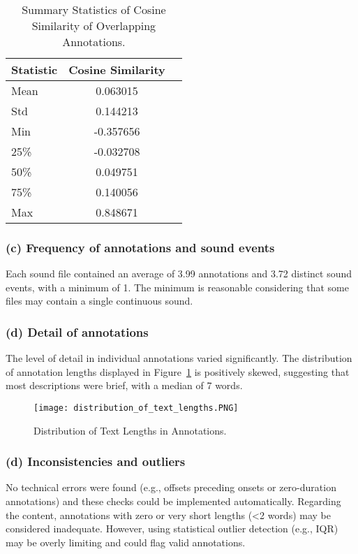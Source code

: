 \documentclass{article}
\begin{document}
\begin{table}[h]
    \caption{Summary Statistics of Cosine Similarity of Overlapping Annotations.}
    \label{tab:cos}
    \centering
    \begin{tabular}{lcl}
        \toprule
        Statistic & Cosine Similarity \\ \midrule
        Mean            & 0.063015 \\
        Std             & 0.144213 \\
        Min             & -0.357656 \\
        25\%            & -0.032708 \\
        50\%            & 0.049751 \\
        75\%            & 0.140056 \\ 
        Max             & 0.848671 \\ \bottomrule
    \end{tabular}
\end{table}

\subsubsection{(c) Frequency of annotations and sound events}
Each sound file contained an average of 3.99 annotations and 3.72 distinct sound events, with a minimum of 1. The minimum is reasonable considering that some files may contain a single continuous sound.

\subsubsection{(d) Detail of annotations}
The level of detail in individual annotations varied significantly. The distribution of annotation lengths displayed in Figure~\ref{fig:len} is positively skewed, suggesting that most descriptions were brief, with a median of 7 words.

\begin{figure}[h]
    \centering
    \texttt{[image: distribution\_of\_text\_lengths.PNG]}
    \caption{Distribution of Text Lengths in Annotations.}
    \label{fig:len}
\end{figure}

\subsubsection{(d) Inconsistencies and outliers}
No technical errors were found (e.g., offsets preceding onsets or zero-duration annotations) and these checks could be implemented automatically.
Regarding the content, annotations with zero or very short lengths (<2 words) may be considered inadequate. However, using statistical outlier detection (e.g., IQR) may be overly limiting and could flag valid annotations.


\end{document}
